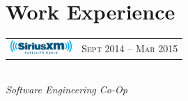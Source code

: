 \documentclass[10pt]{article}
\begin{document}
\color{text1} %




\par{
\vspace{0.0cm}
	

\begin{minipage}[t]{0.5\textwidth} %
\vspace{0pt} %


\section{Work Experience} 


\begin{tabular}{ L{5cm} R{3.5cm} }
\includegraphics[height=0.5cm]{siriusxm} & 
{\raggedleft\textsc{Sept 2014 -- Mar 2015}} \\
\end{tabular}
{\raggedright\large \\
\textit{Software Engineering Co-Op}\\[5pt]}


\end{minipage}}
\end{document}
